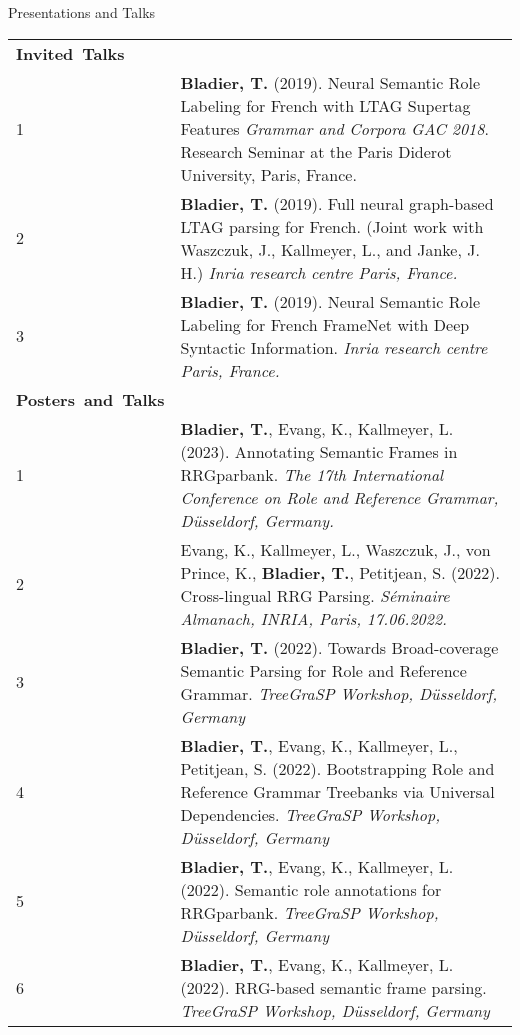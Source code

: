 \documentclass{resume} %
\begin{document}
\begin{rSection}{Presentations and Talks}

\hspace{-20pt}
\begin{tabular}{p{0.1cm}p{17cm}}
{\bf Invited\textcolor{white}{a}Talks} & \\[10pt]
1 & {\bf Bladier, T.} (2019). Neural Semantic Role Labeling for French with LTAG Supertag Features {\it Grammar and Corpora GAC 2018}. Research Seminar at the Paris Diderot University, Paris, France.\\[5pt]
2 & {\bf Bladier, T.} (2019). Full neural graph-based LTAG parsing for French. (Joint work with Waszczuk, J., Kallmeyer, L., and Janke, J. H.) {\it Inria research centre Paris, France.} \\[5pt]
3 & {\bf Bladier, T.} (2019). Neural Semantic Role Labeling for French FrameNet with Deep Syntactic Information. {\it Inria research centre Paris, France.} \\[20pt]

{\bf Posters\textcolor{white}{a}and\textcolor{white}{a}Talks} & \\[10pt]


1 & {\bf Bladier, T.}, Evang, K., Kallmeyer, L. (2023). Annotating Semantic Frames in RRGparbank. \textit{The 17th International Conference on Role and Reference Grammar, Düsseldorf, Germany.} \\[5pt]

2 & Evang, K., Kallmeyer, L., Waszczuk, J., von Prince, K., {\bf Bladier, T.}, Petitjean, S. (2022). Cross-lingual RRG Parsing. \textit{Séminaire Almanach, INRIA, Paris, 17.06.2022.} \\[5pt]

3 & {\bf Bladier, T.} (2022). Towards Broad-coverage Semantic Parsing for Role and Reference Grammar. \textit{TreeGraSP Workshop, Düsseldorf, Germany} \\[5pt]

4 & {\bf Bladier, T.}, Evang, K., Kallmeyer, L., Petitjean, S. (2022). Bootstrapping Role and Reference Grammar Treebanks via Universal Dependencies. \textit{TreeGraSP Workshop, Düsseldorf, Germany} \\[5pt]

5 & {\bf Bladier, T.}, Evang, K., Kallmeyer, L. (2022). Semantic role annotations for RRGparbank. \textit{TreeGraSP Workshop, Düsseldorf, Germany} \\[5pt]

6 & {\bf Bladier, T.}, Evang, K., Kallmeyer, L. (2022). RRG-based semantic frame parsing. \textit{TreeGraSP Workshop, Düsseldorf, Germany} \\[5pt]


\end{tabular}
\end{rSection}
\end{document}
